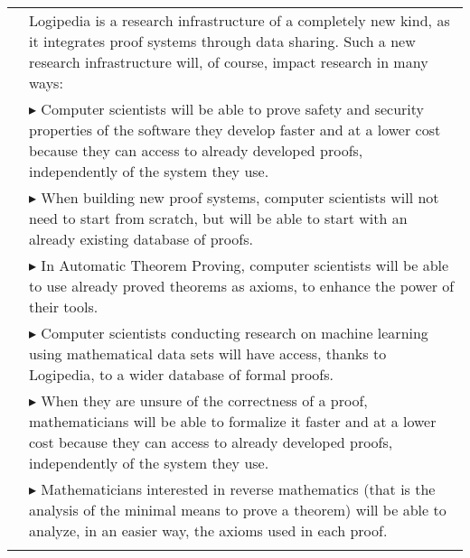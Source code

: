 \begin{longtable}{|p{}|p{}|}
&
Logipedia is a research
infrastructure of a completely new kind, as it integrates proof systems
through data sharing. Such a new research infrastructure will, of
course, impact research in many ways:
\\
&
$\blacktriangleright$ Computer scientists
will be able to prove safety and security
  properties of the software they develop faster and at a lower cost
  because they can access to already developed proofs, independently
  of the system they use.
\\
&
$\blacktriangleright$ When building new proof systems, computer scientists will not
  need to start from scratch, but will be able to start with an already
  existing database of proofs.
\\
&
$\blacktriangleright$ In Automatic Theorem Proving, computer scientists will be able
  to use already proved theorems as axioms, to enhance the power of
  their tools.
\\
&
$\blacktriangleright$ Computer scientists conducting research on machine learning
using mathematical data sets will have access, thanks to Logipedia,
to a wider database of formal proofs.
\\
&
$\blacktriangleright$ When they are unsure of the correctness of a proof,
  mathematicians will be able to formalize it faster and at a lower
  cost because they can access to already developed proofs,
  independently of the system they use.
\\
&
$\blacktriangleright$
Mathematicians interested in reverse mathematics (that is the analysis
of the minimal means to prove a theorem) will be able to analyze, in
an easier way, the axioms used in each proof.
\\
&


\end{longtable}
